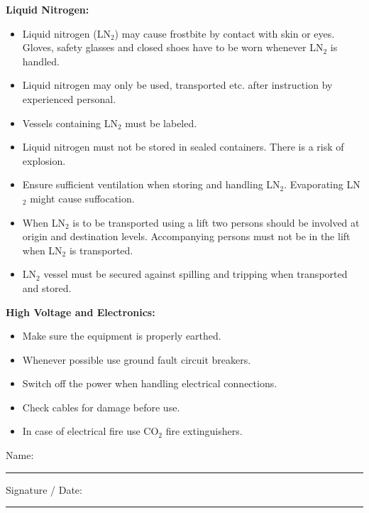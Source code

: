 \documentclass[11pt]{article}
\begin{document}
{\bf Liquid Nitrogen:}
\begin{itemize}
\item Liquid nitrogen (LN$_2$) may cause frostbite by contact with
  skin or eyes. Gloves, safety glasses and closed shoes have to be
  worn whenever LN$_2$ is handled.
\item Liquid nitrogen may only be used, transported etc. after
  instruction by experienced personal.
\item Vessels containing LN$_2$ must be labeled.
\item Liquid nitrogen must not be stored in sealed containers. There
  is a risk of explosion.
\item Ensure sufficient ventilation when storing and handling
  LN$_2$. Evaporating LN$_2$ might cause suffocation.
\item When LN$_2$ is to be transported using a lift two persons should
  be involved at origin and destination levels. Accompanying persons
  must not be in the lift when LN$_2$ is transported.
\item LN$_2$ vessel must be secured against spilling and tripping when
  transported and stored.
\end{itemize}

{\bf High Voltage and Electronics:}
\begin{itemize}
\item Make sure the equipment is properly earthed.
\item Whenever possible use ground fault circuit breakers.
\item Switch off the power when handling electrical connections.
\item Check cables for damage before use.
\item In case of electrical fire use CO$_2$ fire extinguishers.
\end{itemize}

\vspace{15mm}
{\Large Name:}
\begin{center}
\vspace{-5mm}
\rule{\textwidth}{1pt}%
\vspace{5mm}
Signature / Date: \rule{10cm}{0.5pt}%

\end{center}
\end{document}

